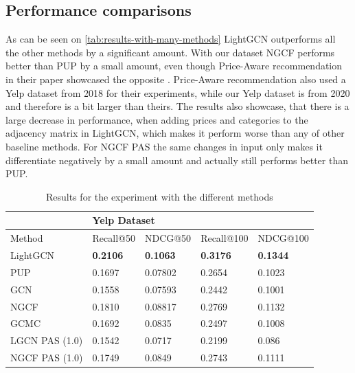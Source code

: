 \subsection{Performance comparisons}
As can be seen on \autoref{tab:results-with-many-methods} LightGCN outperforms all the other methods by a significant amount.
With our dataset NGCF performs better than PUP by a small amount, even though Price-Aware recommendation in their paper showcased the opposite \cite{Priceaware}.
Price-Aware recommendation also used a Yelp dataset from 2018 for their experiments, while our Yelp dataset is from 2020 and therefore is a bit larger than theirs.
The results also showcase, that there is a large decrease in performance, when adding prices and categories to the adjacency matrix in LightGCN, which makes it perform worse than any of other baseline methods.
For NGCF PAS the same changes in input only makes it differentiate negatively by a small amount and actually still performs better than PUP.
\begin{table}[h!]
    \centering
    \begin{tabular}{|l|l|l|l|l|}
        \hline
        \rowcolor[HTML]{FFFFFF}
                       & \multicolumn{4}{l|}{\cellcolor[HTML]{FFFFFF}Yelp Dataset}                                                       \\ \hline
        Method         & Recall@50                                                 & NDCG@50         & Recall@100      & NDCG@100        \\ \hline
        LightGCN       & \textbf{0.2106}                                           & \textbf{0.1063} & \textbf{0.3176} & \textbf{0.1344} \\ \hline
        PUP            & 0.1697                                                    & 0.07802         & 0.2654          & 0.1023          \\ \hline
        GCN            & 0.1558                                                    & 0.07593         & 0.2442          & 0.1001          \\ \hline
        NGCF           & 0.1810                                                    & 0.08817         & 0.2769          & 0.1132          \\ \hline
        GCMC           & 0.1692                                                    & 0.0835          & 0.2497          & 0.1008          \\ \hline
        LGCN PAS (1.0) & 0.1542                                                    & 0.0717          & 0.2199          & 0.086           \\ \hline
        NGCF PAS (1.0) & 0.1749                                                    & 0.0849          & 0.2743          & 0.1111          \\ \hline
    \end{tabular}
    \caption{Results for the experiment with the different methods}
    \label{tab:results-with-many-methods}
\end{table}
